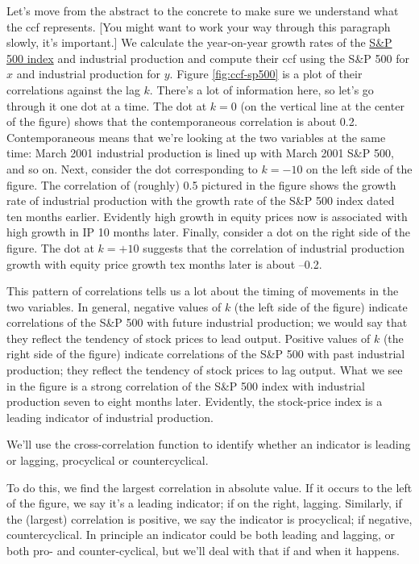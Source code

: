 Let's move from the abstract to the concrete to make sure we
understand what the ccf represents.
[You might want to work your way through this paragraph slowly,
it's important.]
We calculate the year-on-year growth rates of the \href{http://research.stlouisfed.org/fred2/series/SP500}{S\&P 500 index}
and industrial production and compute their ccf using
the S\&P 500 for $x$ and industrial production for $y$.
Figure \ref{fig:ccf-sp500} is a plot of their correlations against
the lag $k$.
There's a lot of information here, so let's go through it
one dot at a time.
The dot at $k=0$ (on the vertical line at the center of the figure)
shows that the contemporaneous correlation is about 0.2.
Contemporaneous means that we're looking at the two variables
at the same time:
March 2001 industrial production is lined up with March 2001 S\&P 500,
and so on.
Next, consider the dot corresponding to $ k = -10$ on the left
side of the figure.
The correlation of (roughly) 0.5 pictured in the figure
shows the growth rate of industrial production with
the growth rate of the S\&P 500 index dated
ten months earlier.
Evidently high growth in equity prices now
is associated with high growth in IP 10 months later.
Finally, consider a dot on the right side of the figure.
The dot at $k=+10$ suggests that the correlation
of industrial production growth with equity price growth tex months
later is about --0.2.

This pattern of correlations tells us a lot about the
timing of movements in the two variables.
In general, negative values of $k$ (the left side of the figure)
indicate correlations of the S\&P 500 with
future industrial production; we would say that they reflect the tendency
of stock prices to lead output.
Positive values of $k$ (the right side of the figure)
indicate correlations of the S\&P 500 with
past industrial production; they reflect
the tendency of stock prices to lag output.
What we see in the figure is a strong correlation of the S\&P 500 index
with industrial production seven to eight months later.
Evidently, the stock-price index is a leading indicator of
industrial production. 

We'll use the cross-correlation function to identify whether
an indicator is leading or lagging, procyclical 
 or   countercyclical.   

To do this, we find the largest correlation in absolute value.
If it occurs to the left of the figure, we say it's a leading indicator;
if on the right, lagging.
Similarly, if the (largest) correlation is positive,
we say the indicator is procyclical;
if negative,   countercyclical.
In principle an indicator could be both leading and lagging,
or both pro- and counter-cyclical,
but we'll deal with that if and when it happens.


